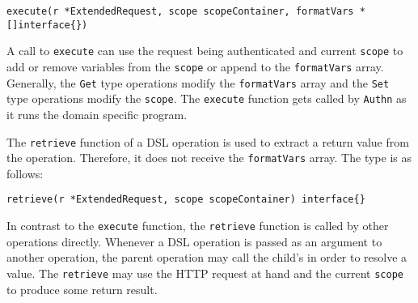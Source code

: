 \begin{lstlisting}
execute(r *ExtendedRequest, scope scopeContainer, formatVars *[]interface{})
\end{lstlisting}

A call to \lstinline{execute} can use the request being authenticated and current \lstinline{scope} to add or remove variables from the \lstinline{scope} or append to the \lstinline{formatVars} array. Generally, the \lstinline{Get} type operations modify the \lstinline{formatVars} array and the \lstinline{Set} type operations modify the \lstinline{scope}. The \lstinline{execute} function gets called by \lstinline{Authn} as it runs the domain specific program.

The \lstinline{retrieve} function of a DSL operation is used to extract a return value from the operation. Therefore, it does not receive the \lstinline{formatVars} array. The type is as follows:

\begin{lstlisting}
retrieve(r *ExtendedRequest, scope scopeContainer) interface{}
\end{lstlisting}

In contrast to the \lstinline{execute} function, the \lstinline{retrieve} function is called by other operations directly. Whenever a DSL operation is passed as an argument to another operation, the parent operation may call the child's  in order to resolve a value. The \lstinline{retrieve} may use the HTTP request at hand and the current \lstinline{scope} to produce some return result.

\iffalse

\fi

